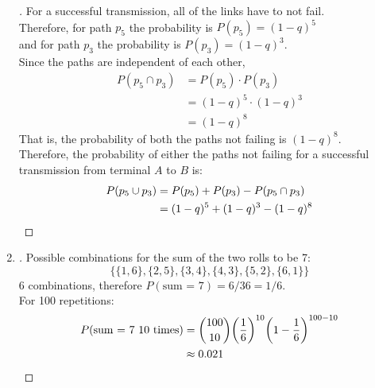 \documentclass[paper=usletter, fontsize=12pt]{article}
\begin{document}
\begin{enumerate}
\begin{proof}[\unskip\nopunct]
            For a successful transmission, all of the links have to not fail.\\
            Therefore, for path $p_5$ the probability is $P(p_5)=(1-q)^5$\\
            and for path $p_3$ the probability is $P(p_3) = (1-q)^3$. \\
            Since the paths are independent of each other,
            \begin{align*}
                P(p_5 \cap p_3) & = P(p_5)\cdot P(p_3) \\
                & = (1-q)^5 \cdot (1-q)^3\\
                & =(1-q)^8
            \end{align*}
            That is, the probability of both the paths not failing is
            $(1-q)^8$. \\
            Therefore, the probability of either the paths not failing for a
            successful transmission from terminal $A$ to $B$ is:
            \begin{align*}
                P(p_5 \cup p_3) & = P(p_5) + P(p_3) - P(p_5 \cap p_3) \\
                & = (1-q)^5 + (1-q)^3 - (1-q)^8 \qedhere
            \end{align*}
        \end{proof}
        \vspace{0.2in}

        \item
        \begin{proof}[\unskip\nopunct]
            Possible combinations for the sum of the two rolls to be 7: \\
            \begin{equation*}
                \{\{1,6\}, \{2,5\}, \{3,4\}, \{4,3\}, \{5,2\}, \{6,1\}\}
            \end{equation*}
            6 combinations, therefore $P(\text{sum = 7})=6/36=1/6$.\\
            For 100 repetitions:
            \begin{align*}
                P(\text{sum = 7 10 times}) & = \binom{100}{10}\bigg(\frac{1}{6}\bigg)^{10}\bigg(1-\frac{1}{6}\bigg)^{100-10}\\
                & \approx 0.021 \qedhere
            \end{align*}
        \end{proof}
        \vspace{0.2in}


\end{enumerate}
\end{document}
